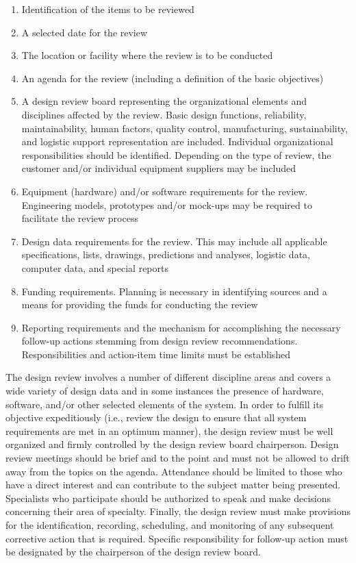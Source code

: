 \begin{enumerate}
\item Identification of the items to be reviewed
\item A selected date for the review
\item The location or facility where the review is to be conducted
\item An agenda for the review (including a definition of the basic objectives)
\item A design review board representing the organizational elements and disciplines affected by the review. Basic design functions, reliability, maintainability, human factors, quality control, manufacturing, sustainability, and logistic support representation are included. Individual organizational responsibilities should be identified. Depending on the type of review, the customer and/or individual equipment suppliers may be included
\item Equipment (hardware) and/or software requirements for the review. Engineering models, prototypes and/or mock-ups may be required to facilitate the review process
\item Design data requirements for the review. This may include all applicable specifications, lists, drawings, predictions and analyses, logistic data, computer data, and special reports
\item Funding requirements. Planning is necessary in identifying sources and a means for providing the funds for conducting the review
\item Reporting requirements and the mechanism for accomplishing the necessary follow-up actions stemming from design review recommendations. Responsibilities and action-item time limits must be established
\end{enumerate}

The design review involves a number of different discipline areas and covers a wide variety of design data and in some instances the presence of hardware, software, and/or other selected elements of the system. In order to fulfill its objective expeditiously (i.e., review the design to ensure that all system requirements are met in an optimum manner), the design review must be well organized and firmly controlled by the design review board chairperson. Design review meetings should be brief and to the point and must not be allowed to drift away from the topics on the agenda. Attendance should be limited to those who have a direct interest and can contribute to the subject matter being presented. Specialists who participate should be authorized to speak and make decisions concerning their area of specialty. Finally, the design review must make provisions for the identification, recording, scheduling, and monitoring of any subsequent corrective action that is required. Specific responsibility for follow-up action must be designated by the chairperson of the design review board.

